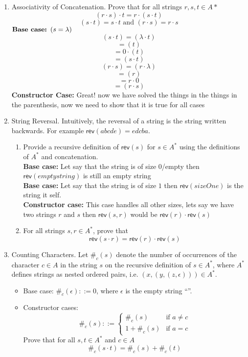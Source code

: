 \documentclass[12pt]{article}
\begin{document}
\begin{enumerate}
\item Associativity of Concatenation. Prove that for all strings $r,s,t \in A*$
$$(r \cdot s) \cdot t = r \cdot (s \cdot t)$$
$$(s \cdot t) = s \cdot t \text{ and } (r \cdot s) = r \cdot s$$
$\text{\textbf{Base case:  }} ( s = \lambda ) $
$$( s \cdot t ) = (\lambda \cdot t) $$
$$=(t)$$
$$= 0 \cdot (t)$$
$$= ( s \cdot t )$$
$$( r \cdot s ) = (r \cdot \lambda) $$
$$=(r)$$
$$= r \cdot 0$$
$$= ( r \cdot s )$$
\textbf{Constructor Case: } Great! now we have solved the things in the things in the parenthesis, now we need to show that it is true for all cases
\item String Reversal. Intuitively, the reversal of a string is the string written backwards. For example $\mathsf{rev}(abcde) = edcba$. \\
\begin{enumerate}
\item Provide a recursive definition of $\mathsf{rev}(s)$ for $s \in A^*$ using the definitions of $A^*$ and concatenation.\\
    \textbf{Base case: } Let say that the string is of size $0$/empty then $\mathsf{rev}(empty string)$ is still an empty string\\
    \textbf{Base case: } Let say that the string is of size $1$ then $\mathsf{rev}(sizeOne)$ is the string it self.\\
    \textbf{Constructor case: } This case handles all other sizes, lets say we have two strings $r$ and $s$ then $\mathsf{rev}(s, r)$ would be $\mathsf{rev}(r) \cdot \mathsf{rev}(s)$
\item For all strings $s, r \in A^*$, prove that 
$$\mathsf{rev}(s \cdot r) = \mathsf{rev}(r) \cdot \mathsf{rev}(s)$$
\end{enumerate}
\item Counting Characters. Let $\#_c(s)$ denote the number of occurrences of the character $c \in A$ in the string $s$ on the recursive definition of $s \in A^*$, where $A^*$ defines strings as nested ordered pairs, i.e. $(x,(y,(z,\epsilon))) \in A^*$.
\begin{itemize}
\item Base case: $\#_c(\epsilon) ::= 0$, where $\epsilon$ is the empty string ``''.
\item Constructor cases:
$$\#_c(s) ::= \begin{cases} \#_c(s) & \text{if }a \not = c \\
1 + \#_c(s) & \text{if }a = c
\end{cases}$$
Prove that for all $s,t \in A^*$ and $c \in A$
$$\#_c(s \cdot t) = \#_c(s) + \#_c(t)$$
\end{itemize}
\end{enumerate}
\pagebreak
\end{document}
